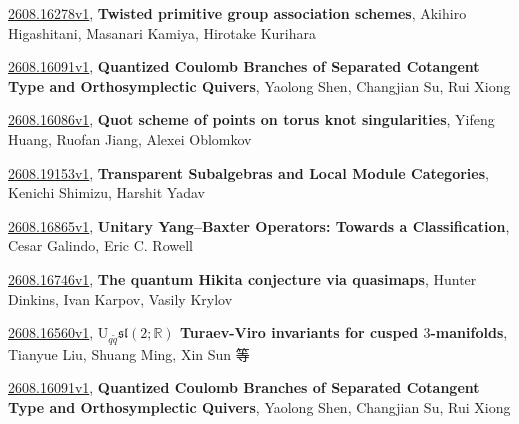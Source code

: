 \documentclass[9pt, a4paper]{article}
\theoremstyle{plain}
\theoremstyle{definition}
\theoremstyle{remark}
\newcommand{\arxiv}[3]{\href{https://arxiv.org/abs/#1}{#1}, \textbf{\textcolor{arxivblue}{#2}}, #3}
\begin{document}
\arxiv{2608.16278v1}{Twisted primitive group association schemes}{Akihiro Higashitani, Masanari Kamiya, Hirotake Kurihara}

\arxiv{2608.16091v1}{Quantized Coulomb Branches of Separated Cotangent Type and Orthosymplectic Quivers}{Yaolong Shen, Changjian Su, Rui Xiong}

\arxiv{2608.16086v1}{Quot scheme of points on torus knot singularities}{Yifeng Huang, Ruofan Jiang, Alexei Oblomkov}

\arxiv{2608.19153v1}{Transparent Subalgebras and Local Module Categories}{Kenichi Shimizu, Harshit Yadav}

\arxiv{2608.16865v1}{Unitary Yang--Baxter Operators: Towards a Classification}{Cesar Galindo, Eric C. Rowell}

\arxiv{2608.16746v1}{The quantum Hikita conjecture via quasimaps}{Hunter Dinkins, Ivan Karpov, Vasily Krylov}

\arxiv{2608.16560v1}{$\mathrm {U}_{q\tilde q}\mathfrak{sl}(2;\mathbb R)$ Turaev-Viro invariants for cusped $3$-manifolds}{Tianyue Liu, Shuang Ming, Xin Sun 等}

\arxiv{2608.16091v1}{Quantized Coulomb Branches of Separated Cotangent Type and Orthosymplectic Quivers}{Yaolong Shen, Changjian Su, Rui Xiong}

\end{document}

